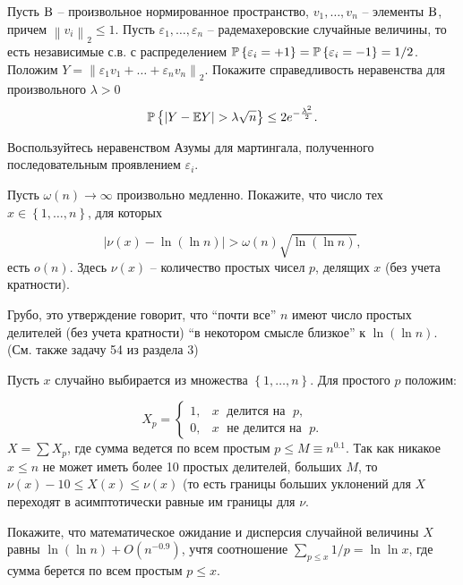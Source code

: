 \begin{problem}

Пусть ${\rm B}$ -- произвольное нормированное пространство, $v_1 ,\ldots ,v_n $ -- элементы ${\rm B}$, причем $\left\| {v_i } \right\|_2\le 1$. 
Пусть $\varepsilon _1 ,\ldots ,\varepsilon _n $ -- радемахеровские случайные величины, то есть 
независимые с.в. с распределением $\mathrm{{\mathbb P}}\left\{ {\varepsilon _i =+1} 
\right\}=\mathrm{{\mathbb P}}\left\{ {\varepsilon _i =-1} \right\}=1/2$. Положим 
$Y=\left\| {\varepsilon _1 v_1 +\ldots +\varepsilon _n v_n } \right\|_2$.
Покажите справедливость неравенства для произвольного $\lambda >0$
\[
\mathrm{{\mathbb P}}\left\{ {\vert Y-\mathrm{{\mathbb E}} Y\vert >\lambda \sqrt n } \right\}\le 2e^{-\frac{\lambda 
^2}{2}}.
\]

\end{problem}

\begin{ordre}  
Воспользуйтесь неравенством Азумы для мартингала, 
полученного последовательным проявлением $\varepsilon_i$.
\end{ordre} 




\begin{problem} 
Пусть $\omega (n)\to \infty $ произвольно медленно. Покажите, что число тех $x\in \left\{1,\ldots ,n\right\}$, для которых

\[\left|\nu (x)-\ln (\ln n)\right|>\omega (n)\sqrt{\ln (\ln n)} ,\] 
есть $o(n)$. Здесь $\nu (x)$ -- количество простых чисел $p$, делящих $x$ (без учета кратности).
\end{problem}

\begin{remark} 
Грубо, это утверждение говорит, что ``почти все'' $n$ имеют число простых делителей (без учета кратности) ``в некотором смысле близкое'' к $\ln (\ln n)$.
(См. также задачу 54 из раздела 3)
\end{remark} 

\begin{ordre} 
Пусть $x$ случайно выбирается из множества $\left\{1,\ldots ,n\right\}$. Для простого $p$ положим: 

\[
X_{p} =\left\{\begin{array}{cc} {1,} & {x \; \mbox{ делится на }   \; p ,} \\ {0,} & { x \;  \mbox{ не делится на }\; p .} \end{array}\right. 
\] 
$X=\sum X_{p}  $, где сумма ведется по всем простым $p\le M\equiv n^{0.1} $. Так как никакое $x\le n$ не может иметь более 10 простых делителей, больших $M$, то $\nu (x)-10\le X(x)\le \nu (x)$ (то есть границы больших уклонений для $X$ переходят в асимптотически равные им границы для $\nu $.

Покажите, что математическое ожидание и дисперсия случайной величины $X$ равны $\ln (\ln n)+O(n^{-0.9})$, учтя соотношение $\sum _{p\le x}1/p  =\ln \ln x$, где сумма берется по всем простым $p\le x$.

\end{ordre} 

